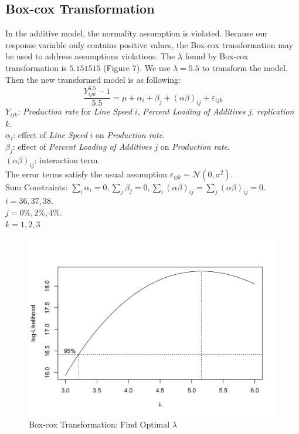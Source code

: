 \documentclass[11pt,a4paper]{article}
\begin{document}
\subsection{Box-cox Transformation}
In the additive model, the normality assumption is violated. Because our response variable only contains positive values, the Box-cox transformation may be used to address assumptions violations. The $\lambda$ found by Box-cox transformation is $5.151515$ (Figure 7). We use $\lambda=5.5$ to transform the model. Then the new transformed model is as following:
$$\frac{Y_{ijk}^{5.5}-1}{5.5}=\mu+\alpha_i+\beta_j+(\alpha\beta)_{ij}+\varepsilon_{ijk}$$
$Y_{ijk}$: \textit{Production rate} for \textit{Line Speed} $i$, \textit{Percent Loading of Additives} $j$, \textit{replication} $k$.\\
$\alpha_i$: effect of \textit{Line Speed} $i$ on \textit{Production rate}.\\
$\beta_j$: effect of \textit{Percent Loading of Additives} $j$ on \textit{Production rate}.\\
$(\alpha\beta)_{ij}$: interaction term.\\
The error terms satisfy the usual assumption $\varepsilon_{i j k} \sim \mathcal{N}\left(0, \sigma^{2}\right)$.\\
Sum Constraints: $\sum_{i} \alpha_{i}=0, \sum_{j} \beta_{j}=0, \sum_{i}(\alpha \beta)_{i j}=\sum_{j}(\alpha \beta)_{i j}=0$.\\
$i=36,37,38.$\\
$j=0\%,2\%,4\%.$\\
$k=1,2,3$
\begin{figure}[htb]
    \centering
    \includegraphics[scale=0.3]{lam.png}
    \caption{Box-cox Transformation: Find Optimal $\lambda$}
    \label{}
\end{figure}
\end{document}
